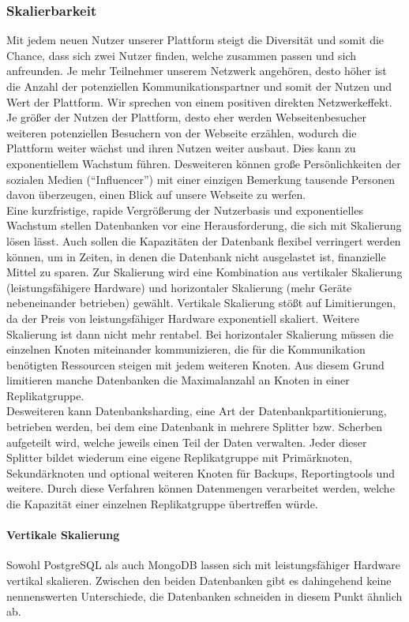 \subsubsection{Skalierbarkeit}
Mit jedem neuen Nutzer unserer Plattform steigt die Diversität und somit die Chance, dass sich zwei Nutzer finden, welche zusammen passen und sich anfreunden. Je mehr Teilnehmer unserem Netzwerk angehören, desto höher ist die Anzahl der potenziellen Kommunikationspartner und somit der Nutzen und Wert der Plattform. Wir sprechen von einem positiven direkten Netzwerkeffekt. Je größer der Nutzen der Plattform, desto eher werden Webseitenbesucher weiteren potenziellen Besuchern von der Webseite erzählen, wodurch die Plattform weiter wächst und ihren Nutzen weiter ausbaut. Dies kann zu exponentiellem Wachstum führen. Desweiteren können große Persönlichkeiten der sozialen Medien (\enquote{Influencer}) mit einer einzigen Bemerkung tausende Personen davon überzeugen, einen Blick auf unsere Webseite zu werfen. \\
Eine kurzfristige, rapide Vergrößerung der Nutzerbasis und exponentielles Wachstum stellen Datenbanken vor eine Herausforderung, die sich mit Skalierung lösen lässt. Auch sollen die Kapazitäten der Datenbank flexibel verringert werden können, um in Zeiten, in denen die Datenbank nicht ausgelastet ist, finanzielle Mittel zu sparen. Zur Skalierung wird eine Kombination aus vertikaler Skalierung (leistungsfähigere Hardware) und horizontaler Skalierung (mehr Geräte nebeneinander betrieben) gewählt. Vertikale Skalierung stößt auf Limitierungen, da der Preis von leistungsfähiger Hardware exponentiell skaliert. Weitere Skalierung ist dann nicht mehr rentabel. Bei horizontaler Skalierung müssen die einzelnen Knoten miteinander kommunizieren, die für die Kommunikation benötigten Ressourcen steigen mit jedem weiteren Knoten. Aus diesem Grund limitieren manche Datenbanken die Maximalanzahl an Knoten in einer Replikatgruppe. \cite{MG3}\\
Desweiteren kann Datenbanksharding, eine Art der Datenbankpartitionierung, betrieben werden, bei dem eine Datenbank in mehrere Splitter bzw. Scherben aufgeteilt wird, welche jeweils einen Teil der Daten verwalten. Jeder dieser Splitter bildet wiederum eine eigene Replikatgruppe mit Primärknoten, Sekundärknoten und optional weiteren Knoten für Backups, Reportingtools und weitere. Durch diese Verfahren können Datenmengen verarbeitet werden, welche die Kapazität einer einzelnen Replikatgruppe übertreffen würde. \cite{MS1}

\paragraph{Vertikale Skalierung\\}
Sowohl PostgreSQL als auch MongoDB lassen sich mit leistungsfähiger Hardware vertikal skalieren. Zwischen den beiden Datenbanken gibt es dahingehend keine nennenswerten Unterschiede, die Datenbanken schneiden in diesem Punkt ähnlich ab.

